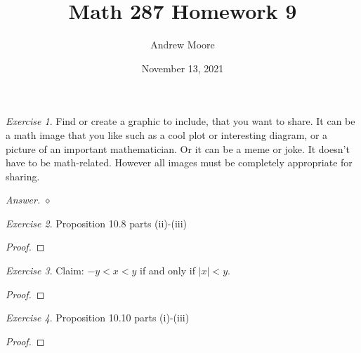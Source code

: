 \documentclass[12pt,oneside]{amsart}
\title{Math 287 Homework 9}
\author{Andrew Moore}
\date{November 13, 2021} %
\theoremstyle{remark}
\newtheorem{exer}{Exercise}
\newenvironment{answer}{\bigskip\noindent\emph{Answer.}}{\hfill$\diamond$\newline}
\begin{document}
\maketitle

\begin{exer}
Find or create a graphic to include, that you want to share. It can be a math image that you like such as a cool plot or interesting diagram, or a picture of an important mathematician. Or it can be a meme or joke. It doesn’t have to be math-related. However all images must be completely appropriate for sharing.
\end{exer}
\begin{answer}
\end{answer}

\newpage
\begin{exer}
Proposition 10.8 parts (ii)-(iii)
\end{exer}
\begin{proof}
\end{proof}

\newpage
\begin{exer}
Claim: $-y < x < y$ if and only if $|x| < y$.
\end{exer}
\begin{proof}
\end{proof}

\newpage
\begin{exer}
Proposition 10.10 parts (i)-(iii)
\end{exer}
\begin{proof}
\end{proof}
\end{document}
